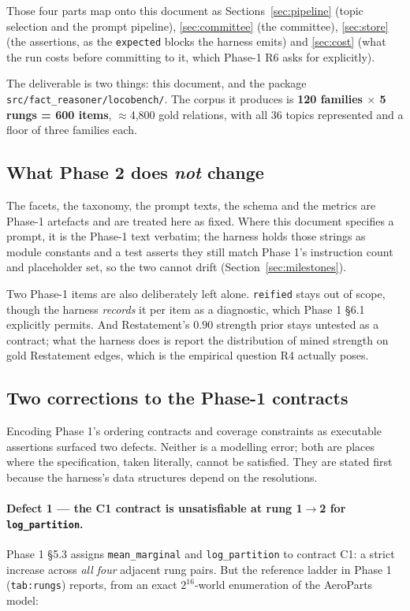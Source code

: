\documentclass[11pt]{article}
\newcommand{\readout}[1]{\texttt{#1}}
\newcommand{\pymod}[1]{\texttt{#1}}
\begin{document}
Those four parts map onto this document as Sections~\ref{sec:pipeline} (topic selection and the
prompt pipeline), \ref{sec:committee} (the committee), \ref{sec:store} (the assertions, as the
\texttt{expected} blocks the harness emits) and \ref{sec:cost} (what the run costs before
committing to it, which Phase-1 R6 asks for explicitly).

The deliverable is two things: this document, and the package
\pymod{src/fact\_reasoner/locobench/}. The corpus it produces is
\textbf{120 families $\times$ 5 rungs = 600 items}, $\approx$4{,}800 gold relations, with all 36
topics represented and a floor of three families each.

\subsection{What Phase 2 does \emph{not} change}

The facets, the taxonomy, the prompt texts, the schema and the metrics are Phase-1 artefacts and
are treated here as fixed. Where this document specifies a prompt, it is the Phase-1 text
verbatim; the harness holds those strings as module constants and a test asserts they still match
Phase 1's instruction count and placeholder set, so the two cannot drift
(Section~\ref{sec:milestones}).

Two Phase-1 items are also deliberately left alone. \readout{reified} stays out of scope, though
the harness \emph{records} it per item as a diagnostic, which Phase 1 §6.1 explicitly permits.
And Restatement's $0.90$ strength prior stays untested as a contract; what the harness does is
report the distribution of mined strength on gold Restatement edges, which is the empirical
question R4 actually poses.

\subsection{Two corrections to the Phase-1 contracts}
\label{sec:defects}

Encoding Phase 1's ordering contracts and coverage constraints as executable assertions surfaced
two defects. Neither is a modelling error; both are places where the specification, taken
literally, cannot be satisfied. They are stated first because the harness's data structures depend
on the resolutions.

\paragraph{Defect 1 --- the C1 contract is unsatisfiable at rung 1$\to$2 for
\readout{log\_partition}.}
Phase 1 §5.3 assigns \readout{mean\_marginal} and \readout{log\_partition} to contract C1: a strict
increase across \emph{all four} adjacent rung pairs. But the reference ladder in Phase 1
(\texttt{tab:rungs}) reports, from an exact $2^{16}$-world enumeration of the AeroParts model:
\end{document}
